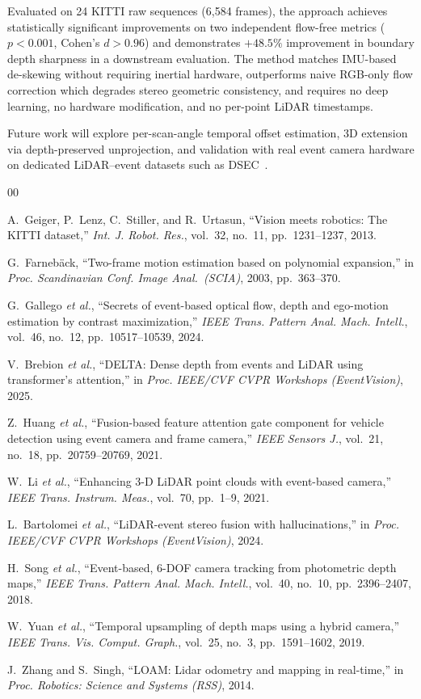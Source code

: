 \documentclass[conference]{IEEEtran}
\begin{document}
Evaluated on 24 KITTI raw sequences (6{,}584 frames), the
approach achieves statistically significant improvements on
two independent flow-free metrics ($p{<}0.001$, Cohen's
$d{>}0.96$) and demonstrates $+48.5\%$ improvement in
boundary depth sharpness in a downstream evaluation.
The method matches IMU-based de-skewing without requiring
inertial hardware, outperforms naive RGB-only flow correction
which degrades stereo geometric consistency, and requires no
deep learning, no hardware modification, and no per-point
LiDAR timestamps.

Future work will explore per-scan-angle temporal offset
estimation, 3D extension via depth-preserved unprojection,
and validation with real event camera hardware on dedicated
LiDAR--event datasets such as DSEC~\cite{bartolomei2024}.

\begin{thebibliography}{00}

A.~Geiger, P.~Lenz, C.~Stiller, and R.~Urtasun,
``Vision meets robotics: The KITTI dataset,''
\textit{Int. J. Robot. Res.}, vol.~32, no.~11,
pp.~1231--1237, 2013.

G.~Farneb{\"a}ck,
``Two-frame motion estimation based on polynomial expansion,''
in \textit{Proc. Scandinavian Conf. Image Anal.\ (SCIA)}, 2003,
pp.~363--370.

G.~Gallego \textit{et al.},
``Secrets of event-based optical flow, depth and ego-motion
estimation by contrast maximization,''
\textit{IEEE Trans. Pattern Anal. Mach. Intell.}, vol.~46,
no.~12, pp.~10517--10539, 2024.

V.~Brebion \textit{et al.},
``DELTA: Dense depth from events and LiDAR using transformer's
attention,''
in \textit{Proc. IEEE/CVF CVPR Workshops (EventVision)}, 2025.

Z.~Huang \textit{et al.},
``Fusion-based feature attention gate component for vehicle
detection using event camera and frame camera,''
\textit{IEEE Sensors J.}, vol.~21, no.~18,
pp.~20759--20769, 2021.

W.~Li \textit{et al.},
``Enhancing 3-D LiDAR point clouds with event-based camera,''
\textit{IEEE Trans. Instrum. Meas.}, vol.~70, pp.~1--9, 2021.

L.~Bartolomei \textit{et al.},
``LiDAR-event stereo fusion with hallucinations,''
in \textit{Proc. IEEE/CVF CVPR Workshops (EventVision)}, 2024.

H.~Song \textit{et al.},
``Event-based, 6-DOF camera tracking from photometric depth
maps,''
\textit{IEEE Trans. Pattern Anal. Mach. Intell.}, vol.~40,
no.~10, pp.~2396--2407, 2018.

W.~Yuan \textit{et al.},
``Temporal upsampling of depth maps using a hybrid camera,''
\textit{IEEE Trans. Vis. Comput. Graph.}, vol.~25, no.~3,
pp.~1591--1602, 2019.

J.~Zhang and S.~Singh,
``LOAM: Lidar odometry and mapping in real-time,''
in \textit{Proc. Robotics: Science and Systems (RSS)}, 2014.

\end{thebibliography}
\end{document}
